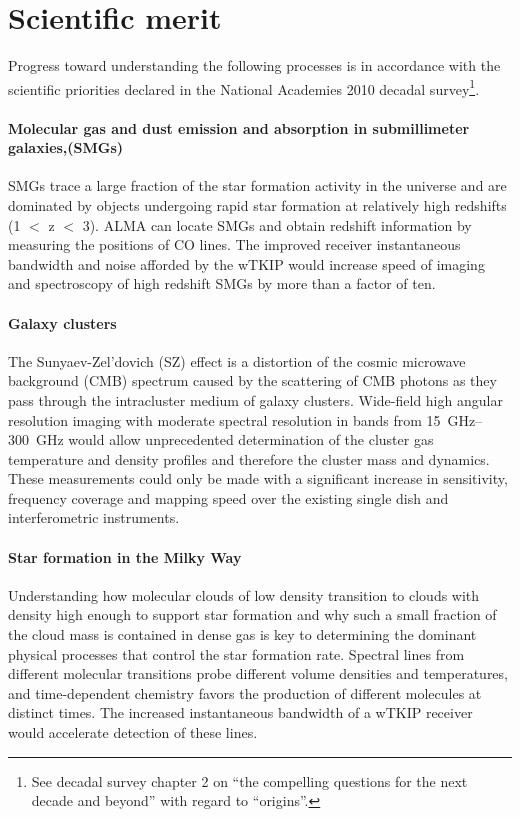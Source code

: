 \section{Scientific merit}
Progress toward understanding the following processes is in accordance with the scientific priorities declared in the National Academies 2010 decadal survey\footnote{See decadal survey chapter 2 on ``the compelling questions for the next decade and beyond'' with regard to ``origins''.}. 

\paragraph*{Molecular gas and dust emission and absorption in submillimeter galaxies,(SMGs)}
SMGs trace a large fraction of the star formation activity in the universe and are dominated by objects undergoing rapid star formation at relatively high redshifts (1 $<$ z $<$ 3). ALMA can locate SMGs  and obtain redshift information by measuring the positions of CO lines. The improved receiver instantaneous bandwidth and noise afforded by the wTKIP would increase speed of imaging and spectroscopy of high redshift SMGs by more than a factor of ten.

\paragraph*{Galaxy clusters}
The Sunyaev-Zel’dovich (SZ) effect is a distortion of the cosmic microwave background (CMB) spectrum caused by the scattering of CMB photons as they pass through the intracluster medium of  galaxy clusters.  Wide-field high angular resolution imaging with moderate spectral resolution in bands from \SIrange{15}{300}{GHz} would allow unprecedented determination of the cluster gas temperature and density profiles and therefore the cluster mass and dynamics. These measurements could only be made with a significant increase in sensitivity, frequency coverage and mapping speed over the existing single dish and interferometric instruments.

\paragraph*{Star formation in the Milky Way}
Understanding how molecular clouds of low density transition to clouds with density high enough to support star formation and why such a small fraction of the cloud mass is contained in dense gas is key to determining the dominant physical processes that control the star formation rate. Spectral lines from different molecular transitions probe different volume densities and temperatures, and time-dependent chemistry favors the production of different molecules at distinct times. The increased instantaneous bandwidth of a wTKIP receiver would accelerate detection of these lines. 


